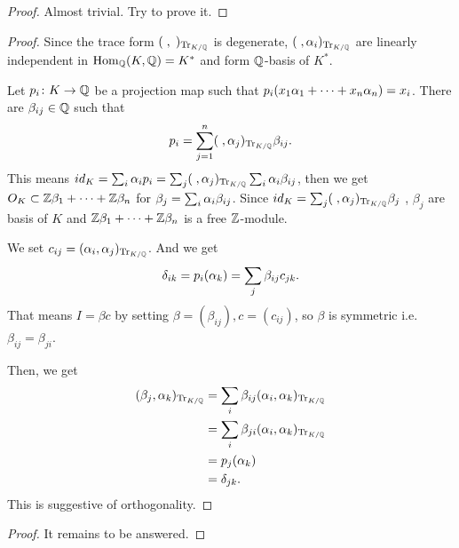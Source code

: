 
\begin{proof}
  Almost trivial. Try to prove it.
\end{proof}


\begin{proof}
  Since the trace form $(\;,\;)_{\operatorname{Tr}_{K/{\mathbb Q}}}$ is degenerate, $(\;, {\alpha}_i)_{\operatorname{Tr}_{K/{\mathbb Q}}}$ are linearly independent in $\operatorname{Hom}_{{\mathbb Q}} (K,{\mathbb Q}) = K^*$ and form ${\mathbb Q}$-basis of $K^*$.

  Let $p_i \colon K \to {\mathbb Q}$ be a projection map such that $p_i(x_1{\alpha}_1 + \cdots + x_n{\alpha}_n) = x_i$. There are $\beta_{ij} \in {\mathbb Q}$ such that
  \[
  p_i = \sum_{j=1}^n (\;, {\alpha}_j)_{\operatorname{Tr}_{K/{\mathbb Q}}} \beta_{ij}.
  \]
  This means $id_K = \sum_i {\alpha}_i p_i = \sum_j (\;, {\alpha}_j)_{\operatorname{Tr}_{K/{\mathbb Q}}} \sum_i {\alpha}_i \beta_{ij}$, then we get
  $O_K \subset {\mathbb Z} \beta_1 + \cdots + {\mathbb Z} \beta_n$ for $\beta_j = \sum_i {\alpha}_i \beta_{ij}$. Since $id_K  = \sum_j (\;, {\alpha}_j)_{\operatorname{Tr}_{K/{\mathbb Q}}} \beta_j$ , $\beta_j$ are basis of $K$ and ${\mathbb Z} \beta_1 + \cdots + {\mathbb Z} \beta_n$ is a free ${\mathbb Z}$-module.

  We set $c_{ij} = ({\alpha}_i, {\alpha}_j)_{\operatorname{Tr}_{K/{\mathbb Q}}}$. And we get
  \[
  {\delta}_{ik} = p_i({\alpha}_k) = \sum_j \beta_{ij} c_{jk}.
  \]
  That means $I = \beta c$ by setting $\beta = (\beta_{ij}), c=(c_{ij})$, so $\beta$ is symmetric i.e. $\beta_{ij} = \beta_{ji}$.

  Then, we get
  \begin{align*}
    (\beta_j, {\alpha}_k)_{\operatorname{Tr}_{K/{\mathbb Q}}} &= \sum_i \beta_{ij} ({\alpha}_i, {\alpha}_k)_{\operatorname{Tr}_{K/{\mathbb Q}}} \\
    &= \sum_i \beta_{ji} ({\alpha}_i, {\alpha}_k)_{\operatorname{Tr}_{K/{\mathbb Q}}} \\
    &= p_j({\alpha}_k ) \\
    &= {\delta}_{jk}.
  \end{align*}
  This is suggestive of orthogonality.
\end{proof}


\begin{proof}
It remains to be answered.
\end{proof}


